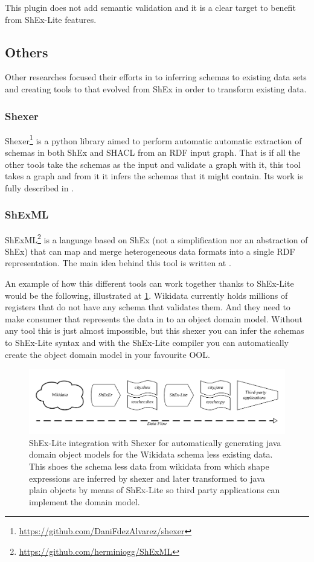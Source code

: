 This plugin does not add semantic validation and it is a clear target to benefit from ShEx-Lite features.

\subsection{Others}
Other researches focused their efforts in to inferring schemas to existing data sets and creating tools to that
evolved from ShEx in order to transform existing data.

\subsubsection{Shexer}
Shexer\footnote{\url{https://github.com/DaniFdezAlvarez/shexer}} is a python library aimed to perform automatic
automatic extraction of schemas in both ShEx and SHACL from an RDF input graph. That is if all the other tools
take the schemas as the input and validate a graph with it, this tool takes a graph and from it it infers the
schemas that it might contain. Its work is fully described in \cite{iovka-auto-shex-shacl, fernandez2016inference}.

\subsubsection{ShExML}
ShExML\footnote{\url{https://github.com/herminiogg/ShExML}} is a language based on ShEx (not a simplification nor
an abstraction of ShEx) that can map and merge heterogeneous data formats into a single RDF representation.
The main idea behind this tool is written at \cite{shexml}.

\bigskip

An example of how this different tools can work together thanks to ShEx-Lite would be the following, illustrated
at \cref{fig:shex-lite-shexer-integration}.
Wikidata currently holds millions of registers that do not have any schema that validates them. And they need to
make consumer that represents the data in to an object domain model. Without any tool this is just almost impossible,
but this shexer you can infer the schemas to ShEx-Lite syntax and with the ShEx-Lite compiler you can automatically
create the object domain model in your favourite OOL.

\begin{figure}
    \includegraphics[width=\textwidth]{images/shex-lite-shexer-integration.png}
    \centering
    \caption[ShEx-Lite integration with Shexer]{ShEx-Lite integration with Shexer for automatically generating
    java domain object models for the Wikidata schema less existing data. This shoes the schema less data from
    wikidata from which shape expressions are inferred by shexer and later transformed to java plain objects by
    means of ShEx-Lite so third party applications can implement the domain model.}
	\label{fig:shex-lite-shexer-integration}
\end{figure}